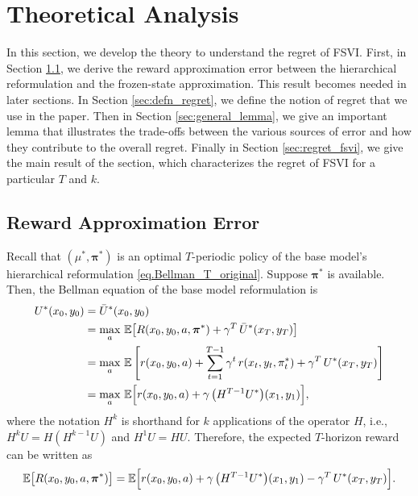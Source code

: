 \documentclass[11pt, notitlepage]{article}
\newcommand{\E}{\mathbb{E}}
\newcommand{\1}{\mathbbm{1}}
\begin{document}
\section{Theoretical Analysis}
\label{sec:theory}

In this section, we develop the theory to understand the regret of FSVI. First, in Section \ref{sec:reward_approx_error}, we derive the reward approximation error between the hierarchical reformulation and the frozen-state approximation. This result becomes needed in later sections. In Section \ref{sec:defn_regret}, we define the notion of regret that we use in the paper. Then in Section \ref{sec:general_lemma}, we give an important lemma that illustrates the trade-offs between the various sources of error and how they contribute to the overall regret. Finally in Section \ref{sec:regret_fsvi}, we give the main result of the section, which characterizes the regret of FSVI for a particular $T$ and $k$.

\subsection{Reward Approximation Error}
\label{sec:reward_approx_error}

Recall that $(\mu^*,\boldsymbol{\pi}^*)$ is an optimal $T$-periodic policy of the base model's hierarchical reformulation \eqref{eq.Bellman_T_original}. Suppose $\boldsymbol{\pi}^*$ is available. Then, the Bellman equation of the base model reformulation is
\begin{align}
    U^*(x_0,y_0) 
    &= \bar{U}^*(x_0,y_0) \nonumber\\
    &= \max_{a} \, \E \bigl[ R(x_0,y_0, a, \boldsymbol{\pi}^*) + \gamma^T \, \bar{U}^*(x_T,y_T) \bigr] \nonumber\\
    &= \max_{a}  \, \E \left[ r(x_0,y_0,a) + \sum_{t=1}^{T-1} \gamma^t \, r(x_t,y_t,\pi^*_t) + \gamma^T \, U^*(x_T,y_T) \right] \nonumber\\
    &= \max_{a} \, \E \Bigl[ r(x_0,y_0,a) + \gamma \, \bigl (H^{T-1} U^* \bigr) (x_1,y_1) \Bigr], \label{eq.base_model_reform2}
\end{align}
where the notation $H^k$ is shorthand for $k$ applications of the operator $H$, i.e., $H^k U = H(H^{k-1} U)$ and $H^1 U = H U$.
Therefore, the expected $T$-horizon reward can be written as
\begin{equation} \label{eq.R1_a}
    \E \bigl [R(x_0,y_0, a, \boldsymbol{\pi}^*) \bigr] = \E \Bigl [r(x_0,y_0,a) + \gamma \, \bigl (H^{T-1} U^* \bigr) (x_1,y_1) - \gamma^T \, U^*(x_T,y_T) \Bigr].
\end{equation}
\end{document}
